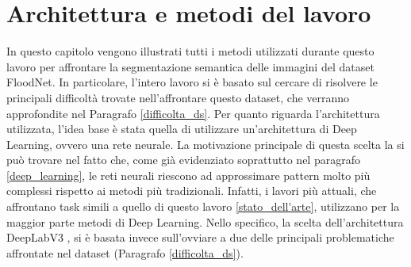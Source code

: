 \chapter{Architettura e metodi del lavoro}
\label{chap_archi}
In questo capitolo vengono illustrati tutti i metodi utilizzati durante questo lavoro per affrontare la segmentazione semantica delle immagini del dataset FloodNet.
In particolare, l'intero lavoro si è basato sul cercare di risolvere le principali difficoltà trovate nell'affrontare questo dataset, che verranno approfondite nel Paragrafo \ref{difficolta_ds}.
Per quanto riguarda l'architettura utilizzata, l'idea base è stata quella di utilizzare un'architettura di Deep Learning, ovvero una rete neurale. La motivazione principale di questa scelta la si può trovare nel fatto che, come già evidenziato soprattutto nel paragrafo \ref{deep_learning}, le reti neurali riescono ad approssimare pattern molto più complessi rispetto ai metodi più tradizionali. Infatti, i lavori più attuali, che affrontano task simili a quello di questo lavoro \ref{stato_dell'arte}, utilizzano per la maggior parte metodi di Deep Learning. Nello specifico, la scelta dell'architettura DeepLabV3 \cite{deeplabv3}, si è basata invece sull'ovviare a due delle principali problematiche affrontate nel dataset (Paragrafo \ref{difficolta_ds}). 











